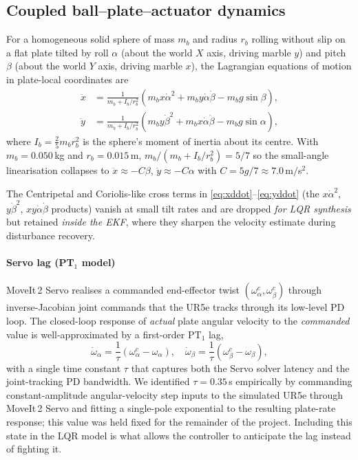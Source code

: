 \documentclass[conference]{IEEEtran}
\begin{document}
\subsection{Coupled ball--plate--actuator dynamics}
\label{sec:dyn}
For a homogeneous solid sphere of mass $m_b$ and radius $r_b$ rolling without
slip on a flat plate tilted by roll $\alpha$ (about the world $X$ axis,
driving marble $y$) and pitch $\beta$ (about the world $Y$ axis, driving
marble $x$), the Lagrangian equations of motion in plate-local coordinates
are \cite{Sotnikov2017,Awtar2002}
\begin{align}
\ddot{x} &= \tfrac{1}{m_b+I_b/r_b^2}\!\left( m_b x \dot{\alpha}^2 + m_b y \dot{\alpha}\dot{\beta} - m_b g \sin\beta \right),\label{eq:xddot}\\
\ddot{y} &= \tfrac{1}{m_b+I_b/r_b^2}\!\left( m_b y \dot{\beta}^2 + m_b x \dot{\alpha}\dot{\beta} - m_b g \sin\alpha \right),\label{eq:yddot}
\end{align}
where $I_b = \tfrac{2}{5} m_b r_b^2$ is the sphere's moment of inertia about
its centre. With $m_b = 0.050\,$kg and $r_b = 0.015\,$m,
$m_b/(m_b+I_b/r_b^2) = 5/7$ so the small-angle linearisation collapses to
$\ddot{x}\approx -C\beta$, $\ddot{y}\approx -C\alpha$ with
$C = 5g/7 \approx 7.0\,$m$/$s$^2$.

The Centripetal and Coriolis-like cross terms in
\eqref{eq:xddot}--\eqref{eq:yddot} (the
$x\dot\alpha^2$, $y\dot\beta^2$, $xy\dot\alpha\dot\beta$ products) vanish at
small tilt rates and are dropped \emph{for LQR synthesis} but retained
\emph{inside the EKF}, where they sharpen the velocity estimate during
disturbance recovery.

\paragraph*{Servo lag (PT$_1$ model)}
MoveIt\,2 Servo realises a commanded end-effector twist
$(\omega^c_\alpha, \omega^c_\beta)$ through inverse-Jacobian joint commands
that the UR5e tracks through its low-level PD loop. The closed-loop response
of \emph{actual} plate angular velocity to the \emph{commanded} value is
well-approximated by a first-order PT$_1$ lag,
\begin{equation}
\dot{\omega}_\alpha = \frac{1}{\tau}\!\left( \omega^c_\alpha - \omega_\alpha \right), \quad
\dot{\omega}_\beta  = \frac{1}{\tau}\!\left( \omega^c_\beta  - \omega_\beta  \right),
\label{eq:pt1}
\end{equation}
with a single time constant $\tau$ that captures both the Servo solver
latency and the joint-tracking PD bandwidth. We identified $\tau =
0.35\,$s empirically by commanding constant-amplitude angular-velocity
step inputs to the simulated UR5e through MoveIt\,2 Servo and fitting a
single-pole exponential to the resulting plate-rate response; this value
was held fixed for the remainder of the project. Including this state in
the LQR model is what allows the controller to anticipate the lag
instead of fighting it.
\end{document}
